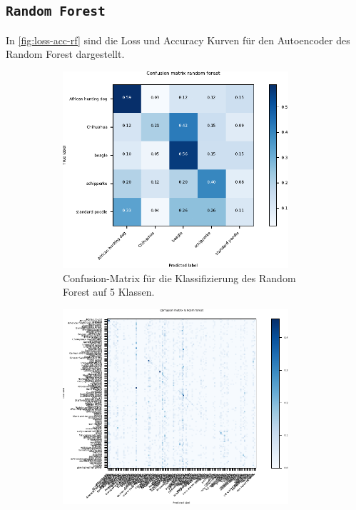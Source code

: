 \subsection{\texttt{Random Forest}}
In \autoref{fig:loss-acc-rf} sind die Loss und Accuracy Kurven für den
Autoencoder des Random Forest dargestellt.
\begin{figure}
  \begin{subfigure}{0.49\textwidth}
    \centering
    \includegraphics[width=0.92\textwidth]{pics/ergebnisse/RF/confusion_matrix_rf.pdf}
    \caption{Confusion-Matrix für die Klassifizierung des Random Forest auf 5 Klassen.}
    \label{sub:confusion-rf-5}
  \end{subfigure}
  \qquad
  \begin{subfigure}{0.49\textwidth}
    \centering
    \includegraphics[width=0.92\textwidth]{pics/ergebnisse/RF/confusion_matrix_big.pdf}

\end{subfigure}
\end{figure}
